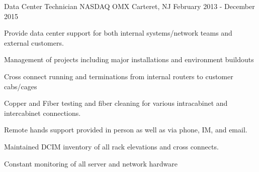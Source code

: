 \begin{cventries}

	\cventry
	{Data Center Technician}
	{NASDAQ OMX}
	{Carteret, NJ}
	{February 2013 - December 2015}
	{
		\begin{cvitems}
		\item {Provide data center support for both internal systems/network teams and external customers.}
		\item {Management of projects including major installations and environment buildouts}
		\item {Cross connect running and terminations from internal routers to customer cabs/cages}
		\item {Copper and Fiber testing and fiber cleaning for various intracabinet and intercabinet connections.}
		\item {Remote hands support provided in person as well as via phone, IM, and email.}
		\item {Maintained DCIM inventory of all rack elevations and cross connects.}
		\item {Constant monitoring of all server and network hardware}
		\end{cvitems}
	}

\end{cventries}
